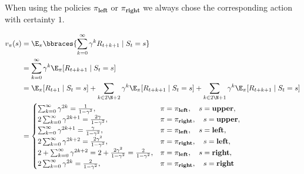 \begin{solution}

When using the policies $\pi_\textbf{left}$ or $\pi_\textbf{right}$ we always chose the corresponding action with certainty $1$.

\begin{align*}
    v_\pi(s)
    & =
    \E_\pi
    \bbraces
    {
        \sum_{k=0}^\infty
            \gamma^k R_{t+k+1}
        \mid
        S_t = s
    } \\
    & =
    \sum_{k=0}^\infty
        \gamma^k
        \E_\pi[R_{t+k+1} \mid S_t = s] \\
    & =
    \E_\pi[R_{t+1} \mid S_t = s]
    +
    \sum_{k \in 2 \N + 2}
        \gamma^k
        \E_\pi[R_{t+k+1} \mid S_t = s]
    +
    \sum_{k \in 2 \N + 1}
        \gamma^k
        \E_\pi[R_{t+k+1} \mid S_t = s] \\
    & =
    \begin{cases}
        \sum_{k=0}^\infty \gamma^{2 k} = \frac{1}{1 - \gamma^2},
        & \pi = \pi_\textbf{left},  \quad s = \textbf{upper}, \\
        2 \sum_{k=0}^\infty \gamma^{2 k + 1} = \frac{2 \gamma}{1 - \gamma^2},
        & \pi = \pi_\textbf{right}, \quad s = \textbf{upper}, \\
        \sum_{k=0}^\infty \gamma^{2 k  + 1} = \frac{\gamma}{1 - \gamma^2},
        & \pi = \pi_\textbf{left},  \quad s = \textbf{left},  \\
        2 \sum_{k=0}^\infty \gamma^{2 k + 2} = \frac{2 \gamma^2}{1 - \gamma^2},
        & \pi = \pi_\textbf{right}, \quad s = \textbf{left},  \\
        2 + \sum_{k=0}^\infty \gamma^{2 k + 2} = 2 + \frac{2 \gamma^2}{1 - \gamma^2} = \frac{2}{1 - \gamma^2},
        & \pi = \pi_\textbf{left},  \quad s = \textbf{right}, \\
        2 \sum_{k=0}^\infty \gamma^{2 k} = \frac{2}{1 - \gamma^2},
        & \pi = \pi_\textbf{right}, \quad s = \textbf{right}
    \end{cases}
\end{align*}


\end{solution}
